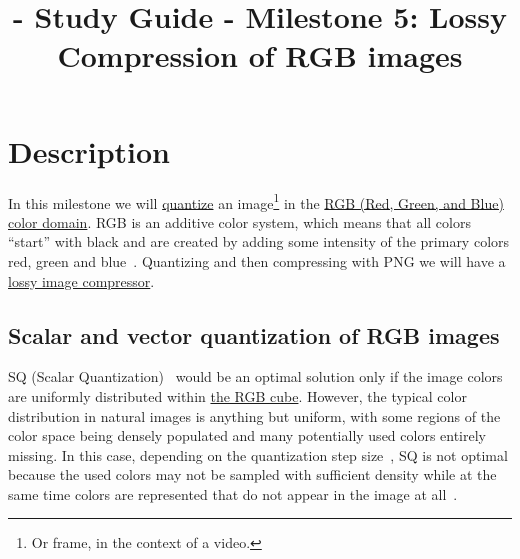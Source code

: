 

\title{\SM{} - Study Guide - Milestone 5: Lossy Compression of RGB images}

\maketitle

\tableofcontents

\section{Description}

In this milestone we will
\href{https://vicente-gonzalez-ruiz.github.io/quantization/}{quantize}
an image\footnote{Or frame, in the context of a video.} in the
\href{https://en.wikipedia.org/wiki/RGB_color_model}{RGB (Red, Green,
  and Blue) color domain}. RGB is an additive color system, which
means that all colors ``start'' with black and are created by adding
some intensity of the primary colors red, green and
blue~\cite{burger2016digital}. Quantizing and then compressing with
PNG we will have a
\href{https://en.wikipedia.org/wiki/Lossy_compression}{lossy image
  compressor}.


\subsection{Scalar and vector quantization of RGB images}

SQ (Scalar Quantization)~\cite{vruiz__scalar_quantization} would be an
optimal solution only if the image colors are uniformly distributed
within \href{https://en.wikipedia.org/wiki/RGB_color_model}{the RGB
  cube}. However, the typical color distribution in natural images is
anything but uniform, with some regions of the color space being
densely populated and many potentially used colors entirely
missing. In this case, depending on the quantization step
size~\cite{vruiz__signal_quantization}, SQ is not optimal because the
used colors may not be sampled with suﬃcient density while at the same
time colors are represented that do not appear in the image at
all~\cite{burger2016digital}.

